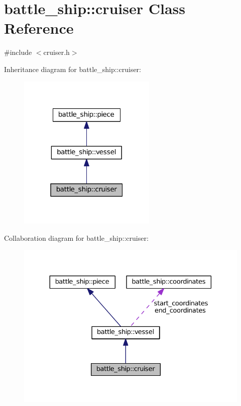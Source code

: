 \hypertarget{classbattle__ship_1_1cruiser}{}\section{battle\+\_\+ship\+:\+:cruiser Class Reference}
\label{classbattle__ship_1_1cruiser}


{\ttfamily \#include $<$cruiser.\+h$>$}



Inheritance diagram for battle\+\_\+ship\+:\+:cruiser\+:
\nopagebreak
\begin{figure}[H]
\begin{center}
\leavevmode
\includegraphics[width=187pt]{classbattle__ship_1_1cruiser__inherit__graph}
\end{center}
\end{figure}


Collaboration diagram for battle\+\_\+ship\+:\+:cruiser\+:
\nopagebreak
\begin{figure}[H]
\begin{center}
\leavevmode
\includegraphics[width=330pt]{classbattle__ship_1_1cruiser__coll__graph}
\end{center}
\end{figure}
